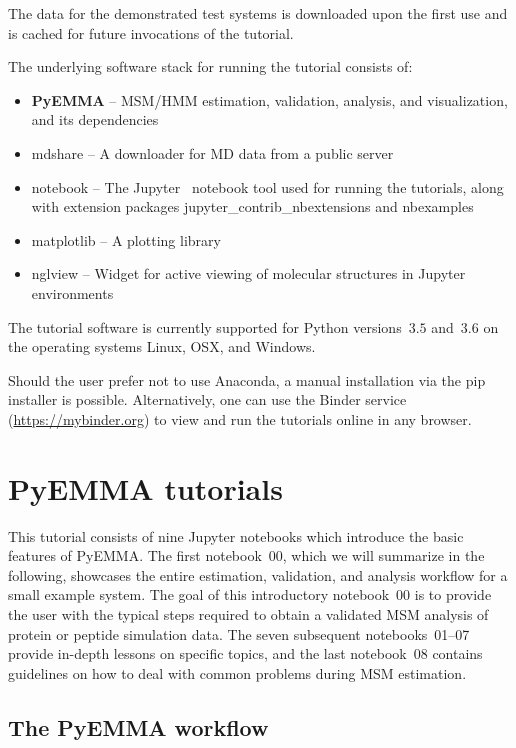 \documentclass[9pt,tutorial]{livecoms}
\begin{document}
The data for the demonstrated test systems is downloaded upon the first use and is cached for future invocations of the tutorial.

The underlying software stack for running the tutorial consists of:
\begin{itemize}
\item \textbf{PyEMMA} -- MSM/HMM estimation, validation, analysis, and visualization, and its dependencies~\cite{pyemma}
\item mdshare -- A downloader for MD data from a public server
\item notebook -- The Jupyter~\cite{jupyter} notebook tool used for running the tutorials, along with extension packages jupyter\_contrib\_nbextensions and nbexamples
\item matplotlib -- A plotting library~\cite{matplotlib}
\item nglview -- Widget for active viewing of molecular structures in Jupyter environments~\cite{nglview}
\end{itemize}

The tutorial software is currently supported for Python versions~$3.5$ and~$3.6$ on the operating systems Linux, OSX, and Windows.

Should the user prefer not to use Anaconda, a manual installation via the pip installer is possible.
Alternatively, one can use the Binder service (\url{https://mybinder.org}) to view and run the tutorials online in any browser.

\section{PyEMMA tutorials}

This tutorial consists of nine Jupyter notebooks which introduce the basic features of PyEMMA.
The first notebook~00, which we will summarize in the following, showcases the entire estimation,
validation, and analysis workflow for a small example system.
The goal of this introductory notebook~00 is to provide the user with the typical steps required to obtain a validated MSM analysis of protein or peptide simulation data.
The seven subsequent notebooks~01--07 provide in-depth lessons on specific topics,
and the last notebook~08 contains guidelines on how to deal with common problems during MSM estimation.

\subsection{The PyEMMA workflow}
\end{document}

